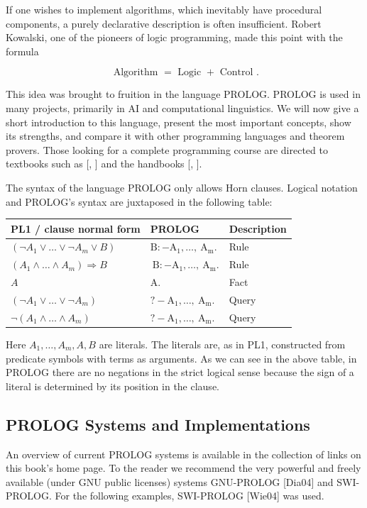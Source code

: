 \documentclass[10pt]{book}
\begin{document}
If one wishes to implement algorithms, which inevitably have procedural components, a purely declarative description is often insufficient. Robert Kowalski, one of the pioneers of logic programming, made this point with the formula

$$
\text { Algorithm }=\text { Logic }+ \text { Control } .
$$

This idea was brought to fruition in the language PROLOG. PROLOG is used in many projects, primarily in AI and computational linguistics. We will now give a short introduction to this language, present the most important concepts, show its strengths, and compare it with other programming languages and theorem provers. Those looking for a complete programming course are directed to textbooks such as [\cite{bra11}, \cite{cm94}] and the handbooks [\cite{wie04}, \cite{dia04}].

The syntax of the language PROLOG only allows Horn clauses. Logical notation and PROLOG's syntax are juxtaposed in the following table:

\begin{center}
\begin{tabular}{lll}
\hline
PL1 / clause normal form & PROLOG & Description \\
\hline
$\left(\neg A_{1} \vee \ldots \vee \neg A_{m} \vee B\right)$ & $\mathrm{B}:-\mathrm{A}_{1}, \ldots, \mathrm{~A}_{\mathrm{m}}$. & Rule \\
\hline
$\left(A_{1} \wedge \ldots \wedge A_{m}\right) \Rightarrow B$ & $\mathrm{~B}:-\mathrm{A}_{1}, \ldots, \mathrm{~A}_{\mathrm{m}}$. & Rule \\
\hline
$A$ & A. & Fact \\
\hline
$\left(\neg A_{1} \vee \ldots \vee \neg A_{m}\right)$ & $?-\mathrm{A}_{1}, \ldots, \mathrm{~A}_{\mathrm{m}}$. & Query \\
\hline
$\neg\left(A_{1} \wedge \ldots \wedge A_{m}\right)$ & $?-\mathrm{A}_{1}, \ldots, \mathrm{~A}_{\mathrm{m}}$. & Query \\
\hline
\end{tabular}
\end{center}

Here $A_{1}, \ldots, A_{m}, A, B$ are literals. The literals are, as in PL1, constructed from predicate symbols with terms as arguments. As we can see in the above table, in PROLOG there are no negations in the strict logical sense because the sign of a literal is determined by its position in the clause.

\subsection{PROLOG Systems and Implementations}
An overview of current PROLOG systems is available in the collection of links on this book's home page. To the reader we recommend the very powerful and freely available (under GNU public licenses) systems GNU-PROLOG [Dia04] and SWI-PROLOG. For the following examples, SWI-PROLOG [Wie04] was used.
\end{document}
